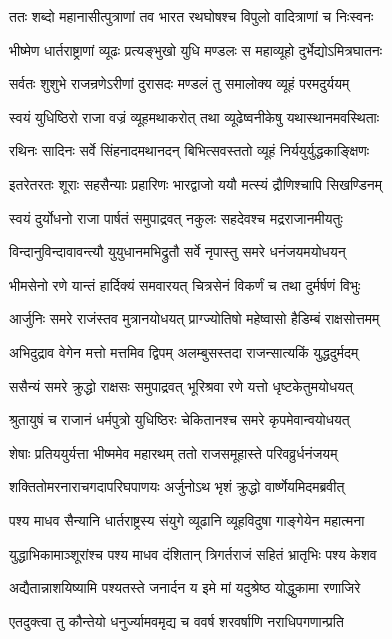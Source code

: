 \twolineshloka
{ततः शब्दो महानासीत्पुत्राणां तव भारत}
{रथघोषश्च विपुलो वादित्राणां च निःस्वनः}


\twolineshloka
{भीष्मेण धार्तराष्ट्राणां व्यूढः प्रत्यङ्भुखो युधि}
{मण्डलः स महाव्यूहो दुर्भेद्योऽमित्रघातनः}


\twolineshloka
{सर्वतः शुशुभे राजन्रणेऽरीणां दुरासदः}
{मण्डलं तु समालोक्य व्यूहं परमदुर्ययम्}


\twolineshloka
{स्वयं युधिष्ठिरो राजा वज्रं व्यूहमथाकरोत्}
{तथा व्यूढेष्वनीकेषु यथास्थानमवस्थिताः}


\twolineshloka
{रथिनः सादिनः सर्वे सिंहनादमथानदन्}
{बिभित्सवस्ततो व्यूहं निर्ययुर्युद्धकाङ्क्षिणः}


\twolineshloka
{इतरेतरतः शूराः सहसैन्याः प्रहारिणः}
{भारद्वाजो ययौ मत्स्यं द्रौणिश्चापि सिखण्डिनम्}


\twolineshloka
{स्वयं दुर्योधनो राजा पार्षतं समुपाद्रवत्}
{नकुलः सहदेवश्च मद्रराजानमीयतुः}


\twolineshloka
{विन्दानुविन्दावावन्त्यौ युयुधानमभिद्रुतौ}
{सर्वे नृपास्तु समरे धनंजयमयोधयन्}


\twolineshloka
{भीमसेनो रणे यान्तं हार्दिक्यं समवारयत्}
{चित्रसेनं विकर्णं च तथा दुर्मर्षणं विभुः}


\twolineshloka
{आर्जुनिः समरे राजंस्तव मुत्रानयोधयत्}
{प्राग्ज्योतिषो महेष्वासो हैडिम्बं राक्षसोत्तमम्}


\twolineshloka
{अभिदुद्राव वेगेन मत्तो मत्तमिव द्विपम्}
{अलम्बुसस्तदा राजन्सात्यकिं युद्धदुर्मदम्}


\twolineshloka
{ससैन्यं समरे क्रुद्धो राक्षसः समुपाद्रवत्}
{भूरिश्रवा रणे यत्तो धृष्टकेतुमयोधयत्}


\twolineshloka
{श्रुतायुषं च राजानं धर्मपुत्रो युधिष्ठिरः}
{चेकितानश्च समरे कृपमेवान्वयोधयत्}


\twolineshloka
{शेषाः प्रतिययुर्यत्ता भीष्ममेव महारथम्}
{ततो राजसमूहास्ते परिवव्रुर्धनंजयम्}


\twolineshloka
{शक्तितोमरनाराचगदापरिघपाणयः}
{अर्जुनोऽथ भृशं क्रुद्धो वार्ष्णेयमिदमब्रवीत्}


\twolineshloka
{पश्य माधव सैन्यानि धार्तराष्ट्रस्य संयुगे}
{व्यूढानि व्यूहविदुषा गाङ्गेयेन महात्मना}


\twolineshloka
{युद्धाभिकामाञ्शूरांश्च पश्य माधव दंशितान्}
{त्रिगर्तराजं सहितं भ्रातृभिः पश्य केशव}


\twolineshloka
{अद्यैतान्नाशयिष्यामि पश्यतस्ते जनार्दन}
{य इमे मां यदुश्रेष्ठ योद्धुकामा रणाजिरे}


\twolineshloka
{एतदुक्त्वा तु कौन्तेयो धनुर्ज्यामवमृद्य च}
{ववर्ष शरवर्षाणि नराधिपगणान्प्रति}


